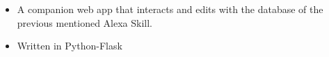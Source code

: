 \documentclass[12pt,letterpaper,sans]{moderncv}        %
\begin{document}
{\begin{itemize}%
\item A companion web app that interacts and edits with the database of the previous mentioned Alexa Skill.
\item Written in Python-Flask
\end{itemize}}


\nocite{*}



\end{document}
